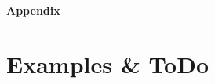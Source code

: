 \appendix	%

\clearforchapter
\begin{vplace}[0.7]
\begin{center}
\Huge \textbf{Appendix}
\end{center}
\end{vplace}











\chapter{Examples \& ToDo}

\clearpage
\listoftodos

